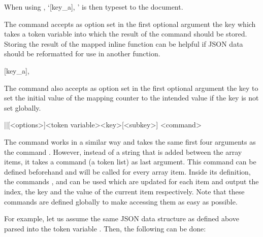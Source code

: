 \documentclass[a4paper]{article}
\begin{document}
{{When using , `[key_a]{, }' is then typeset to the document.

The command \macro{\JSONParseArrayUse} accepts as option set in the first optional argument the key  which takes a token variable into which the result of the command should be stored. Storing the result of the mapped inline function can be helpful if JSON data should be reformatted for use in another function.

\begin{codeexamplecolumns}
[key_a]{,}

\end{codeexamplecolumns}

The command \macro{\JSONParseArrayUse} also accepts as option set in the first optional argument the key  to set the initial value of the mapping counter to the intended value if the key  is not set globally.

\begin{macrodef}
|\JSONParseArrayMapFunction|[<options>]{<token variable>}{<key>}[<subkey>]
  {<command>}
\end{macrodef}
The command \macro{\JSONParseArrayMapFunction} works in a similar way and takes the same first four arguments as the command \macro{\JSONParseArrayUse}. However, instead of a string that is added between the array items, it takes a command (a token list) as last argument. This command can be defined beforehand and will be called for every array item. Inside its definition, the commands \macro{\JSONParseArrayIndex}, \macro{\JSONParseArrayKey} and \macro{\JSONParseArrayValue} can be used which are updated for each item and output the index, the key and the value of the current item respectively. Note that these commands are defined globally to make accessing them as easy as possible.

For example, let us assume the same JSON data structure as defined above parsed into the token variable \macro{\myJSONdata}. Then, the following can be done:

\begin{codeexamplecolumns}
\newcommand{\myJSONitem}{
  \item \emph{\JSONParseArrayValue}
}


\end{codeexamplecolumns}}}
\end{document}
